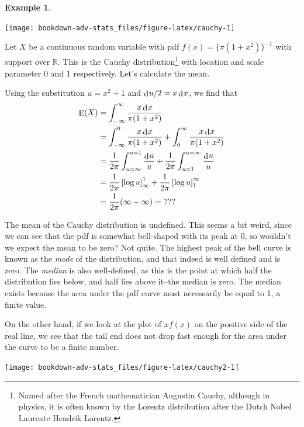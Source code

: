 \documentclass[
]{book}
\DeclareMathOperator{\E}{E}
\newcommand{\bbR}{\mathbb{R}}
\DeclareMathOperator{\dd}{d}
\newcommand{\dint}{\dd\hspace{0.5pt}\!}
\theoremstyle{definition}
\theoremstyle{definition}
\newtheorem{example}{Example}[chapter]
\theoremstyle{definition}
\theoremstyle{definition}
\theoremstyle{remark}
\begin{document}
\begin{example}

\begin{center}\texttt{[image: bookdown-adv-stats\_files/figure-latex/cauchy-1]} \end{center}

Let \(X\) be a continuous random variable with pdf \(f(x)=\{ \pi(1+x^2) \}^{-1}\) with support over \(\bbR\).
This is the Cauchy distribution\footnote{Named after the French mathematician Augustin Cauchy, although in physics, it is often known by the Lorentz distribution after the Dutch Nobel Laureate Hendrik Lorentz.} with location and scale parameter 0 and 1 respectively.
Let's calculate the mean.

Using the substitution \(u = x^2 + 1\) and \(\dint u/2 = x \dint x\), we find that
\begin{align*}
\E(X) 
&= \int_{-\infty}^\infty \frac{x \dint x}{\pi(1+x^2)} \\
&= \int_{-\infty}^0 \frac{x \dint x}{\pi(1+x^2)} + \int_{0}^\infty \frac{x \dint x}{\pi(1+x^2)} \\
&= \frac{1}{2\pi} \int_{u=\infty}^{u=1} \frac{\dint u}{u} + \frac{1}{2\pi} \int_{u=1}^{u=\infty} \frac{\dint u}{u} \\
&= \frac{1}{2\pi} \left[\log u \right]_{\infty}^{1} + \frac{1}{2\pi} \left[\log u \right]^{\infty}_{1} \\
&= \frac{1}{2\pi} (\infty - \infty) = \ ???
\end{align*}

The mean of the Cauchy distribution is undefined.
This seems a bit weird, since we can see that the pdf is somewhat bell-shaped with its peak at 0, so wouldn't we expect the mean to be zero?
Not quite.
The highest peak of the bell curve is known as the \emph{mode} of the distribution, and that indeed is well defined and is zero.
The \emph{median} is also well-defined, as this is the point at which half the distribution lies below, and half lies above it--the median is zero.
The median exists because the area under the pdf curve must necessarily be equal to 1, a finite value.

On the other hand, if we look at the plot of \(xf(x)\) on the positive side of the real line, we see that the tail end does not drop fast enough for the area under the curve to be a finite number.

\begin{center}\texttt{[image: bookdown-adv-stats\_files/figure-latex/cauchy2-1]} \end{center}

\end{example}
\end{document}
